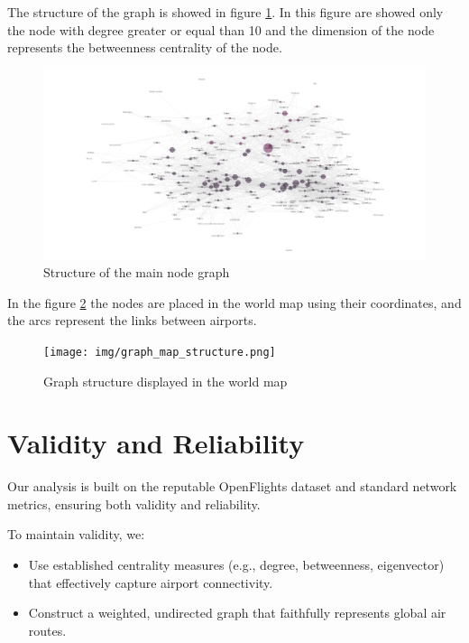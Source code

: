\documentclass[12pt]{article}
\begin{document}
The structure of the graph is showed in figure \ref{fig:graph-structure}. In this figure are showed only the node with degree greater or equal than 10 and the dimension of the node represents the betweenness centrality of the node. 
\begin{figure}[H]
    \centering
    \includegraphics[width=1\linewidth]{img/graph_structure.png}
    \caption{Structure of the main node graph}
    \label{fig:graph-structure}
\end{figure}

In the figure \ref{fig:world-graph} the nodes are placed in the world map using their coordinates, and the arcs represent the links between airports.

\begin{figure}[H]
    \centering
    \texttt{[image: img/graph\_map\_structure.png]}
    \caption{Graph structure displayed in the world map}
    \label{fig:world-graph}
\end{figure}


\section{Validity and Reliability}
Our analysis is built on the reputable OpenFlights dataset and standard network metrics, ensuring both validity and reliability. 

To maintain validity, we:
\begin{itemize}
    \item Use established centrality measures (e.g., degree, betweenness, eigenvector) that effectively capture airport connectivity.
    \item Construct a weighted, undirected graph that faithfully represents global air routes.
\end{itemize}
\end{document}
